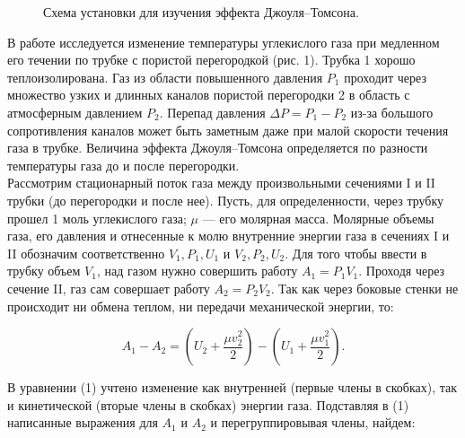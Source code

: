 \documentclass[a4paper, 12pt]{article}%
\begin{document}
	\begin{figure}[h!]
		\caption{Схема установки для изучения эффекта Джоуля–Томсона.}
	\end{figure}
	
	В работе исследуется изменение температуры углекислого газа при медленном его течении по трубке с пористой перегородкой (рис. 1). Трубка 1 хорошо теплоизолирована. Газ из области повышенного давления $P_1$ проходит через множество узких и длинных каналов пористой перегородки 2 в область с атмосферным давлением $P_2$. Перепад давления $\Delta P = P_1 - P_2$ из-за большого сопротивления каналов может быть заметным даже при малой скорости течения газа в трубке. Величина эффекта Джоуля–Томсона определяется по разности температуры газа до и после перегородки.\\
	
	Рассмотрим стационарный поток газа между произвольными сечениями I и II трубки (до перегородки и после нее). Пусть, для определенности, через трубку прошел 1 моль углекислого газа; $\mu$ --- его молярная масса. Молярные объемы газа, его давления и отнесенные к молю внутренние энергии газа в сечениях I и II обозначим соответственно $V_1, P_1, U_1$ и $V_2, P_2, U_2$. Для того чтобы ввести в трубку объем $V_1$, над газом нужно совершить работу $A_1 = P_1V_1$. Проходя через сечение II, газ сам совершает работу $A_2 = P_2V_2$. Так как через боковые стенки не происходит ни обмена теплом, ни передачи механической энергии, то:
	
	\begin{equation}
		A_1 - A_2 = \left(U_2 + \dfrac{\mu v_2^2}{2}\right) - \left(U_1 + \dfrac{\mu v_1^2}{2}\right).
	\end{equation}
	
	В уравнении (1) учтено изменение как внутренней (первые члены в скобках), так и кинетической (вторые члены в скобках) энергии газа. Подставляя в (1) написанные выражения для $A_1$ и $A_2$ и перегруппировывая члены, найдем:
	
\end{document}
